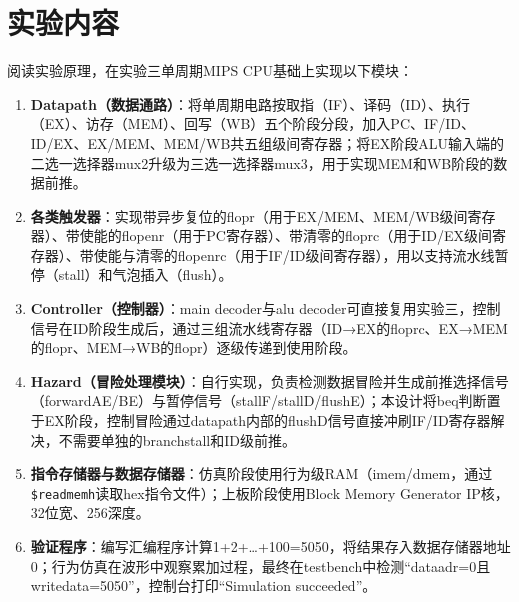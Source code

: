 \section{实验内容}

阅读实验原理，在实验三单周期MIPS CPU基础上实现以下模块：

\begin{enumerate}[(1)]
    \item \textbf{Datapath（数据通路）}：将单周期电路按取指（IF）、译码（ID）、执行（EX）、访存（MEM）、回写（WB）五个阶段分段，加入PC、IF/ID、ID/EX、EX/MEM、MEM/WB共五组级间寄存器；将EX阶段ALU输入端的二选一选择器mux2升级为三选一选择器mux3，用于实现MEM和WB阶段的数据前推。
    \item \textbf{各类触发器}：实现带异步复位的flopr（用于EX/MEM、MEM/WB级间寄存器）、带使能的flopenr（用于PC寄存器）、带清零的floprc（用于ID/EX级间寄存器）、带使能与清零的flopenrc（用于IF/ID级间寄存器），用以支持流水线暂停（stall）和气泡插入（flush）。
    \item \textbf{Controller（控制器）}：main decoder与alu decoder可直接复用实验三，控制信号在ID阶段生成后，通过三组流水线寄存器（ID→EX的floprc、EX→MEM的flopr、MEM→WB的flopr）逐级传递到使用阶段。
    \item \textbf{Hazard（冒险处理模块）}：自行实现，负责检测数据冒险并生成前推选择信号（forwardAE/BE）与暂停信号（stallF/stallD/flushE）；本设计将beq判断置于EX阶段，控制冒险通过datapath内部的flushD信号直接冲刷IF/ID寄存器解决，不需要单独的branchstall和ID级前推。
    \item \textbf{指令存储器与数据存储器}：仿真阶段使用行为级RAM（imem/dmem，通过\texttt{\$readmemh}读取hex指令文件）；上板阶段使用Block Memory Generator IP核，32位宽、256深度。
    \item \textbf{验证程序}：编写汇编程序计算1+2+\ldots+100=5050，将结果存入数据存储器地址0；行为仿真在波形中观察累加过程，最终在testbench中检测``dataadr=0且writedata=5050''，控制台打印``Simulation succeeded''。
\end{enumerate}
